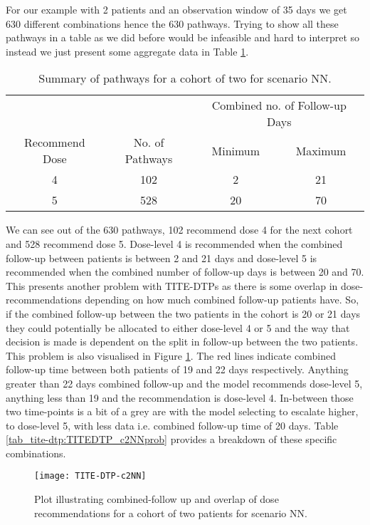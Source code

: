 For our example with 2 patients and an observation window of 35 days we get 630 different combinations hence the 630 pathways. Trying to show all these pathways in a table as we did before would be infeasible and hard to interpret so instead we just present some aggregate data in Table \ref{tab_tite-dtp:TITEDTP_c2NN}. 

\begin{table}[H]
	\centering
	\caption{Summary of pathways for a cohort of two for scenario NN. }
	\label{tab_tite-dtp:TITEDTP_c2NN}
	\begin{tabular}{cccc}
		\hline
		\multicolumn{1}{l}{} & \multicolumn{1}{l}{} & \multicolumn{2}{c}{Combined no. of Follow-up Days} \\ \cline{3-4} 
		Recommend Dose & No. of Pathways & Minimum & Maximum \\ \hline
		4              & 102             & 2       & 21      \\
		5              & 528             & 20      & 70      \\ \hline
	\end{tabular}
\end{table}

We can see out of the 630 pathways, 102 recommend dose 4 for the next cohort and 528 recommend dose 5. Dose-level 4 is recommended when the combined follow-up between patients is between 2 and 21 days and dose-level 5 is recommended when the combined number of follow-up days is between 20 and 70. This presents another problem with TITE-DTPs as there is some overlap in dose-recommendations depending on how much combined follow-up patients have. So, if the combined follow-up between the two patients in the cohort is 20 or 21 days they could potentially be allocated to either dose-level 4 or 5 and the way that decision is made is dependent on the split in follow-up between the two patients. This problem is also visualised in Figure \ref{fig_tite-dtp:c2NNprob}. The red lines indicate combined follow-up time between both patients of 19 and 22 days respectively. Anything greater than 22 days combined follow-up and the model recommends dose-level 5, anything less than 19 and the recommendation is dose-level 4. In-between those two time-points is a bit of a grey are with the model selecting to escalate higher, to dose-level 5, with less data i.e. combined follow-up time of 20 days. Table \ref{tab_tite-dtp:TITEDTP_c2NNprob} provides a breakdown of these specific combinations. 

\begin{figure}[h!]
	\centering
	\caption[Combined follow-up and dose recommendations for cohort of 2 scenario NN.]{Plot illustrating combined-follow up and overlap of dose recommendations for a cohort of two patients for scenario NN.}
	\label{fig_tite-dtp:c2NNprob}
	\texttt{[image: TITE-DTP-c2NN]}
\end{figure}

